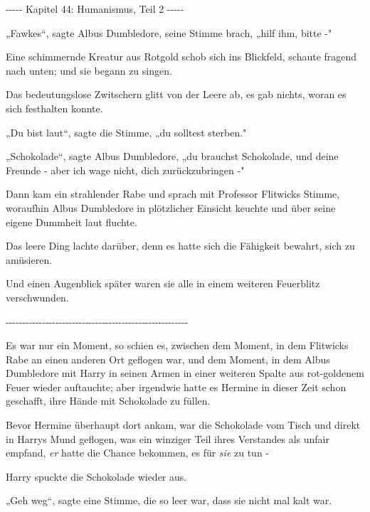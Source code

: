 

\hypertarget{humanismus-teil-2}{%

-\/-\/-\/-\/- Kapitel 44: Humanismus, Teil 2 -\/-\/-\/-\/-

„Fawkes“, sagte Albus Dumbledore, seine Stimme brach, „hilf ihm, bitte -"

Eine schimmernde Kreatur aus Rotgold schob sich ins Blickfeld, schaute fragend nach unten; und sie begann zu singen.

Das bedeutungslose Zwitschern glitt von der Leere ab, es gab nichts, woran es sich festhalten konnte.

„Du bist laut“, sagte die Stimme, „du solltest sterben."

„Schokolade“, sagte Albus Dumbledore, „du brauchst Schokolade, und deine Freunde - aber ich wage nicht, dich zurückzubringen -"

Dann kam ein strahlender Rabe und sprach mit Professor Flitwicks Stimme, woraufhin Albus Dumbledore in plötzlicher Einsicht keuchte und über seine eigene Dummheit laut fluchte.

Das leere Ding lachte darüber, denn es hatte sich die Fähigkeit bewahrt, sich zu amüsieren.

Und einen Augenblick später waren sie alle in einem weiteren Feuerblitz verschwunden.

-\/-\/-\/-\/-\/-\/-\/-\/-\/-\/-\/-\/-\/-\/-\/-\/-\/-\/-\/-\/-\/-\/-\/-\/-\/-\/-\/-\/-\/-\/-\/-\/-\/-\/-\/-\/-\/-\/-\/-\/-\/-\/-\/-\/-\/-\/-\/-\/-\/-\/-\/-\/-\/-\/-

Es war nur ein Moment, so schien es, zwischen dem Moment, in dem Flitwicks Rabe an einen anderen Ort geflogen war, und dem Moment, in dem Albus Dumbledore mit Harry in seinen Armen in einer weiteren Spalte aus rot-goldenem Feuer wieder auftauchte; aber irgendwie hatte es Hermine in dieser Zeit schon geschafft, ihre Hände mit Schokolade zu füllen.

Bevor Hermine überhaupt dort ankam, war die Schokolade vom Tisch und direkt in Harrys Mund geflogen, was ein winziger Teil ihres Verstandes als unfair empfand, \emph{er} hatte die Chance bekommen, es für \emph{sie} zu tun -

Harry spuckte die Schokolade wieder aus.

„Geh weg“, sagte eine Stimme, die so leer war, dass sie nicht mal kalt war.

}
